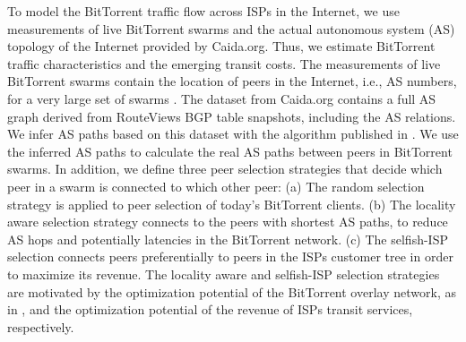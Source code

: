 To model the BitTorrent traffic flow across ISPs in the Internet, we use measurements of live BitTorrent swarms and the actual autonomous system (AS) topology of the Internet provided by Caida.org. Thus, we estimate BitTorrent traffic characteristics and the emerging transit costs. 
The measurements of live BitTorrent swarms contain the location of peers in the Internet, i.e., AS numbers, for a very large set of swarms \cite{Hossfeld2011}.
The dataset from Caida.org contains a full AS graph derived from RouteViews BGP table snapshots, including the AS relations. We infer AS paths based on this dataset with the algorithm published in \cite{yang2009efficient}. 
We use the inferred AS paths to calculate the real AS paths between peers in BitTorrent swarms. In addition, we define three peer selection strategies that decide which peer in a swarm is connected to which other peer: (a) The random selection strategy is applied to peer selection of today's BitTorrent clients. (b) The locality aware selection strategy connects to the peers with shortest AS paths, to reduce AS hops and potentially latencies in the BitTorrent network. (c) The selfish-ISP selection connects peers preferentially to peers in the ISPs customer tree in order to maximize its revenue. The locality aware and selfish-ISP selection strategies are motivated by the optimization potential of the BitTorrent overlay network, as in \cite{Hossfeld2011}, and the optimization potential of the revenue of ISPs transit services, respectively. 

